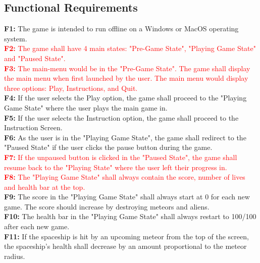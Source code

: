 \documentclass[12pt, titlepage]{article}
\begin{document}
\subsection{Functional Requirements}
 \textbf{F1:} The game is intended to run offline on a Windows or MacOS operating system.\\
 \newline
\textcolor{red}{ \textbf{F2:} The game shall have 4 main states: "Pre-Game State", "Playing Game State" and "Paused State".}\\
 \newline
 \textcolor{red}{ \textbf{F3:} The main-menu would be in the "Pre-Game State". The game shall display the main menu when first launched by the user. The main menu would display three options: Play, Instructions, and Quit.}\\   
 \newline
 \textbf{F4:} If the user selects the Play option, the game shall proceed to the "Playing Game State" where the user plays the main game in.\\
 \newline
 \textbf{F5:} If the user selects the Instruction option, the game shall proceed to the Instruction Screen.\\
 \newline
 \textbf{F6:} As the user is in the "Playing Game State", the game shall redirect to the "Paused State" if the user clicks the pause button during the game.\\
 \newline
\textcolor{red}{  \textbf{F7:} If the unpaused button is clicked in the "Paused State", the game shall resume back to the "Playing State" where the user left their progress in.}\\
 \newline
 \textcolor{red}{ \textbf{F8:} The "Playing Game State" shall always contain the score, number of lives and health bar at the top.}\\
 \newline
 \textbf{F9:} The score in the "Playing Game State" shall always start at 0 for each new game. The score should increase by destroying meteors and aliens.  \\
 \newline
 \textbf{F10:} The health bar in the "Playing Game State" shall always restart to 100/100 after each new game. \\
 \newline
 \textbf{F11:} If the spaceship is hit by an upcoming meteor from the top of the screen, the spaceship's health shall decrease by an amount proportional to the meteor radius. \\
\end{document}
